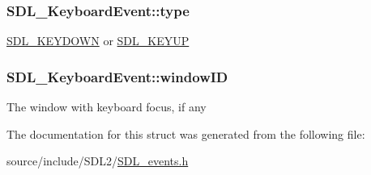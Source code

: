 \subsubsection[{type}]{ S\+D\+L\+\_\+\+Keyboard\+Event\+::type}\label{struct_s_d_l___keyboard_event_ae0b2f2aace6f80c1f47e5a14350d409a}
\hyperlink{_s_d_l__events_8h_a3b589e89be6b35c02e0dd34a55f3fccaacaf8cfd53c985cdbf6a90c811d51a1fc}{S\+D\+L\+\_\+\+K\+E\+Y\+D\+O\+W\+N} or \hyperlink{_s_d_l__events_8h_a3b589e89be6b35c02e0dd34a55f3fccaadefb8866b9d28be21c2c33c35cc66c4b}{S\+D\+L\+\_\+\+K\+E\+Y\+U\+P} \hypertarget{struct_s_d_l___keyboard_event_a56efb6780b96acd5b50d8f797efb3546}{}
\subsubsection[{window\+I\+D}]{ S\+D\+L\+\_\+\+Keyboard\+Event\+::window\+I\+D}\label{struct_s_d_l___keyboard_event_a56efb6780b96acd5b50d8f797efb3546}
The window with keyboard focus, if any 

The documentation for this struct was generated from the following file\+:\begin{DoxyCompactItemize}
\item 
source/include/\+S\+D\+L2/\hyperlink{_s_d_l__events_8h}{S\+D\+L\+\_\+events.\+h}\end{DoxyCompactItemize}
